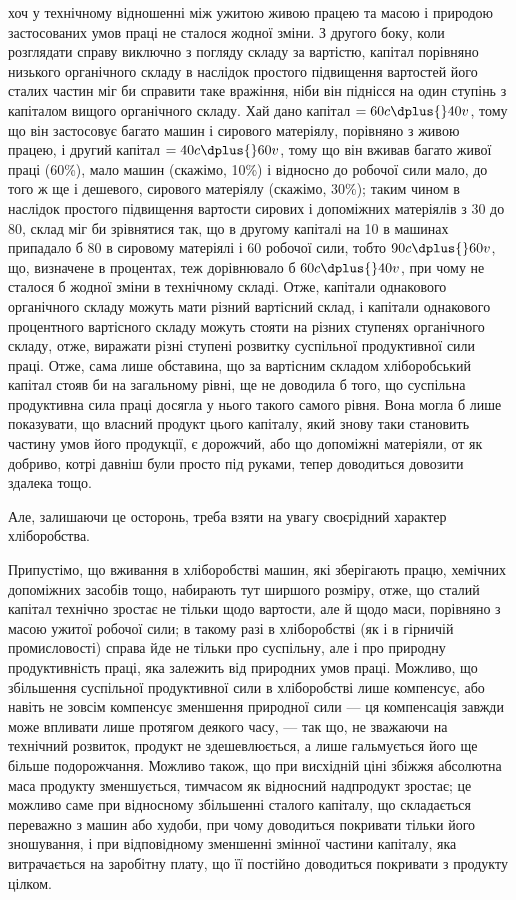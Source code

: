 \parcont{}  %
хоч у технічному відношенні між ужитою живою працею та масою і природою
застосованих умов праці не сталося жодної зміни. З другого боку, коли розглядати
справу виключно з погляду складу за вартістю, капітал порівняно низького
органічного складу в наслідок простого підвищення вартостей його сталих частин
міг би справити таке вражіння, ніби він піднісся на один ступінь з капіталом
вищого органічного складу. Хай дано капітал $= 60c \dplus{} 40v$, тому що він
застосовує багато машин і сирового матеріялу, порівняно з живою працею, і
другий капітал $= 40c \dplus{} 60v$, тому що він вживав багато живої праці (60\%),
мало машин (скажімо, 10\%) і відносно до робочої сили мало, до того ж
ще і дешевого, сирового матеріялу (скажімо, 30\%); таким чином в наслідок простого
підвищення вартости сирових і допоміжних матеріялів з 30 до 80, склад
міг би зрівнятися так, що в другому капіталі на 10 в машинах припадало б 80
в сировому матеріялі і 60 робочої сили, тобто $90c \dplus{} 60v$, що, визначене в процентах,
теж дорівнювало б $60c \dplus{} 40v$, при чому не сталося б жодної зміни в технічному
складі. Отже, капітали однакового органічного складу можуть мати
різний вартісний склад, і капітали однакового процентного вартісного складу
можуть стояти на різних ступенях органічного складу, отже, виражати різні ступені
розвитку суспільної продуктивної сили праці. Отже, сама лише обставина,
що за вартісним складом хліборобський капітал стояв би на загальному рівні, ще
не доводила б того, що суспільна продуктивна сила праці досягла у нього
такого самого рівня. Вона могла б лише показувати, що власний продукт цього
капіталу, який знову таки становить частину умов його продукції, є дорожчий,
або що допоміжні матеріяли, от як добриво, котрі давніш були просто під руками,
тепер доводиться довозити здалека тощо.

Але, залишаючи це осторонь, треба взяти на увагу своєрідний характер
хліборобства.

Припустімо, що вживання в хліборобстві машин, які зберігають працю,
хемічних допоміжних засобів тощо, набирають тут ширшого розміру, отже, що сталий
капітал технічно зростає не тільки щодо вартости, але й щодо маси, порівняно
з масою ужитої робочої сили; в такому разі в хліборобстві (як і в гірничій
промисловості) справа йде не тільки про суспільну, але і про природну продуктивність
праці, яка залежить від природних умов праці. Можливо, що збільшення
суспільної продуктивної сили в хліборобстві лише компенсує, або навіть
не зовсім компенсує зменшення природної сили — ця компенсація завжди може
впливати лише протягом деякого часу, — так що, не зважаючи на технічний
розвиток, продукт не здешевлюється, а лише гальмується його ще більше подорожчання.
Можливо також, що при висхідній ціні збіжжя абсолютна маса
продукту зменшується, тимчасом як відносний надпродукт зростає; це можливо
саме при відносному збільшенні сталого капіталу, що складається переважно
з машин або худоби, при чому доводиться покривати тільки його зношування,
і при відповідному зменшенні змінної частини капіталу, яка витрачається на
заробітну плату, що її постійно доводиться покривати з продукту цілком.

